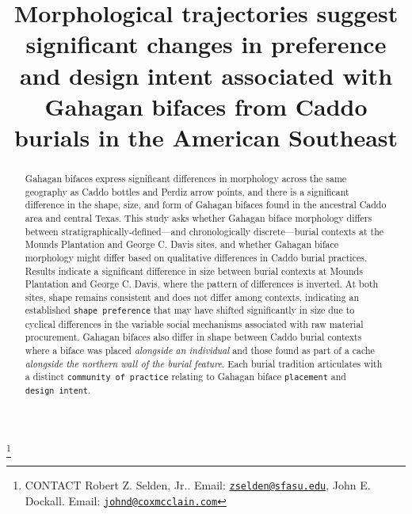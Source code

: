 \documentclass[]{interact}
\theoremstyle{plain}%
\theoremstyle{definition}
\theoremstyle{remark}
\begin{document}

\title{Morphological trajectories suggest significant changes in
preference and design intent associated with Gahagan bifaces from Caddo
burials in the American Southeast}


\author{
}

\thanks{CONTACT Robert Z. Selden,
Jr.. Email: \href{mailto:zselden@sfasu.edu}{\nolinkurl{zselden@sfasu.edu}}, John
E.
Dockall. Email: \href{mailto:johnd@coxmcclain.com}{\nolinkurl{johnd@coxmcclain.com}}}

\maketitle

\begin{abstract}
Gahagan bifaces express significant differences in morphology across the
same geography as Caddo bottles and Perdiz arrow points, and there is a
significant difference in the shape, size, and form of Gahagan bifaces
found in the ancestral Caddo area and central Texas. This study asks
whether Gahagan biface morphology differs between
stratigraphically-defined---and chronologically discrete---burial
contexts at the Mounds Plantation and George C. Davis sites, and whether
Gahagan biface morphology might differ based on qualitative differences
in Caddo burial practices. Results indicate a significant difference in
size between burial contexts at Mounds Plantation and George C. Davis,
where the pattern of differences is inverted. At both sites, shape
remains consistent and does not differ among contexts, indicating an
established \texttt{shape\ preference} that may have shifted
significantly in size due to cyclical differences in the variable social
mechanisms associated with raw material procurement. Gahagan bifaces
also differ in shape between Caddo burial contexts where a biface was
placed \emph{alongside an individual} and those found as part of a cache
\emph{alongside the northern wall of the burial feature}. Each burial
tradition articulates with a distinct \texttt{community\ of\ practice}
relating to Gahagan biface \texttt{placement} and
\texttt{design\ intent}.
\end{abstract}
\end{document}

